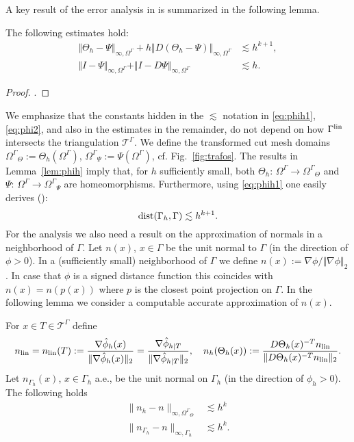 \documentclass[final]{siamltex}
\begin{document}
A key result of the error analysis in \cite{CLARH1} is summarized in the following lemma.
\begin{lemma} \label{lem:phih} The following estimates hold:
\begin{align} 
\Vert \Theta_h - \Psi \Vert_{\infty,{\Omega^{\Gamma}}} + h \Vert D (\Theta_h - \Psi)\Vert_{\infty,{\Omega^{\Gamma}}} & \lesssim h^{k+1},
\label{eq:phih1} \\
\Vert I - \Psi \Vert_{\infty,{\Omega^{\Gamma}}} + \Vert I - D\Psi\Vert_{\infty,{\Omega^{\Gamma}}} & \lesssim h. \label{eq:phi2}
\end{align}
\end{lemma}
\begin{proof}
 \cite[Lemma~5.5 and (5.28)]{CLARH1}.
\end{proof}

We emphasize that the constants hidden in the $\lesssim$ notation in \eqref{eq:phih1}, \eqref{eq:phi2}, and also in the estimates in the remainder, do not depend on how $\Gamma^{\rm lin}$ intersects the triangulation ${\mathcal{T}}^\Gamma$.
We define the transformed cut mesh domains ${\Omega^{\Gamma}}_{\Theta} := \Theta_h({\Omega^{\Gamma}})$, ${\Omega^{\Gamma}}_{\Psi} := \Psi({\Omega^{\Gamma}})$, cf. Fig.~\ref{fig:trafos}.
The results in Lemma~\ref{lem:phih} imply that, for $h$ sufficiently small, both $\Theta_h:\, {\Omega^{\Gamma}} \to {\Omega^{\Gamma}}_{\Theta}$ and $\Psi:\, {\Omega^{\Gamma}} \to {\Omega^{\Gamma}}_{\Psi}$ are homeomorphisms.
Furthermore, using \eqref{eq:phih1} one easily derives (\cite[Lemma 5.6]{CLARH1}):
\begin{equation} \label{resdist}
 {\rm dist}(\Gamma_h,\Gamma) \lesssim h^{k+1}.
\end{equation}
For the analysis we also need a result on the approximation of normals in a neighborhood of $\Gamma$. Let $n(x)$, $x \in \Gamma$ be the unit normal to $\Gamma$ (in the direction of $\phi > 0$). In a (sufficiently small) neighborhood of $\Gamma$ we define $n(x):= \nabla \phi / \Vert \nabla \phi \Vert_2$. In case that $\phi$ is a signed distance function this coincides with $n(x) = n(p(x))$ where $p$ is the closest point projection on $\Gamma$.
In the following lemma we consider a computable accurate approximation of $n(x)$.
\begin{lemma} \label{Lemnormals}
 For $x \in T \in {{\mathcal T}^{\Gamma}}$ define 
\[ {n_{\rm lin}}= {n_{\rm lin}}(T):= \frac{\nabla \hat \phi_h(x)}{\|\nabla \hat \phi_h(x)\|_2} = \frac{\nabla \hat\phi_{h|T}}{\|\nabla \hat \phi_{h|T}\|_2}, \quad n_h(\Theta_h(x)):= \frac{D\Theta_h(x)^{-T}{n_{\rm lin}}}{\|D\Theta_h(x)^{-T}{n_{\rm lin}}\|_2}.
\] 
Let $n_{\Gamma_h}(x)$, $x\in \Gamma_h$ a.e., be the unit normal on $\Gamma_h$ (in the direction of $\phi_h > 0$). The following holds
\begin{align}
 \|n_h - n\|_{\infty, {\Omega^{\Gamma}}_{\Theta}} & \lesssim h^k \label{normalres1} \\
 \|n_{\Gamma_h} - n\|_{\infty, \Gamma_h} & \lesssim h^k. \label{normalres2} 
\end{align}
\end{lemma}
\end{document}
